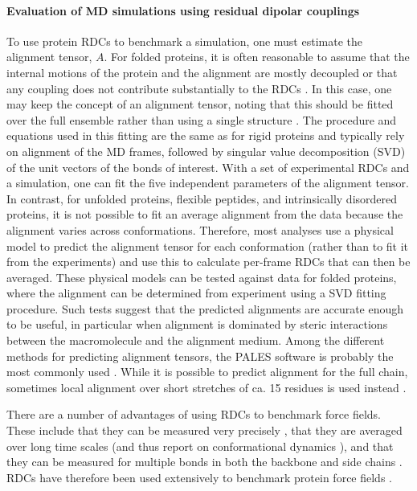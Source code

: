 \documentclass[9pt,review]{livecoms}
\begin{document}
\paragraph{Evaluation of MD simulations using residual dipolar couplings}

To use protein RDCs to benchmark a simulation, one must estimate the alignment tensor, $A$.
For folded proteins, it is often reasonable to assume that the internal motions of the protein and the alignment are mostly decoupled or that any coupling does not contribute substantially to the RDCs \cite{louhivuori2006conformational,salvatella2008influence}.
In this case, one may keep the concept of an alignment tensor, noting that this should be fitted over the full ensemble rather than using a single structure \cite{lindorff2005simultaneous,showalter2007quantitative}.
The procedure and equations used in this fitting are the same as for rigid proteins and typically rely on alignment of the MD frames, followed by singular value decomposition (SVD) of the unit vectors of the bonds of interest.
With a set of experimental RDCs and a simulation, one can fit the five independent parameters of the alignment tensor.
In contrast, for unfolded proteins, flexible peptides, and intrinsically disordered proteins, it is not possible to fit an average alignment from the data because the alignment varies across conformations.
Therefore, most analyses use a physical model to predict the alignment tensor for each conformation (rather than to fit it from the experiments) and use this to calculate per-frame RDCs that can then be averaged.
These physical models can be tested against data for folded proteins, where the alignment can be determined from experiment using a SVD fitting procedure.
Such tests suggest that the predicted alignments are accurate enough to be useful, in particular when alignment is dominated by steric interactions between the macromolecule and the alignment medium.
Among the different methods for predicting alignment tensors, the PALES software is probably the most commonly used \cite{zweckstetter_nmr_2008}.
While it is possible to predict alignment for the full chain, sometimes local alignment over short stretches of ca. 15 residues is used instead \cite{marsh2008calculation}.

There are a number of advantages of using RDCs to benchmark force fields. These include that they can be measured very precisely \cite{chiliveri2021advances}, that they are averaged over long time scales (and thus report on conformational dynamics \cite{lakomek2008self}), and that they can be measured for multiple bonds in both the backbone and side chains \cite{chiliveri2021advances}. RDCs have therefore been used extensively to benchmark protein force fields \cite{lange2010scrutinizing,lindorff-larsen_improved_2010,lindorff2012systematic,robustelli_developing_2018}.
\end{document}
